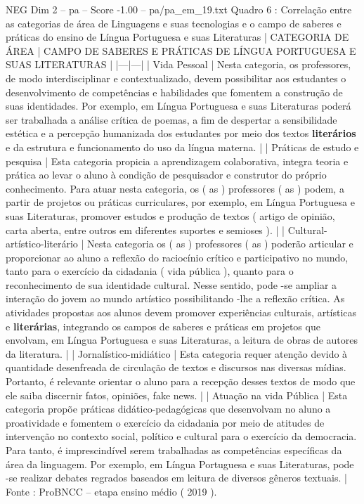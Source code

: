 \begin{textsample}{NEG Dim 2 – pa – Score -1.00 – pa/pa\_em\_19.txt}  \label{ex:f2_neg_221}
Quadro 6 : Correlação entre as categorias de área de Linguagens e suas tecnologias e o campo de saberes e práticas do ensino de Língua Portuguesa e suas Literaturas | CATEGORIA DE ÁREA | CAMPO DE SABERES E PRÁTICAS DE LÍNGUA PORTUGUESA E SUAS LITERATURAS | |---|---| | Vida Pessoal | Nesta categoria, os professores, de modo interdisciplinar e contextualizado, devem possibilitar aos estudantes o desenvolvimento de competências e habilidades que fomentem a construção de suas identidades.
Por exemplo, em Língua Portuguesa e suas Literaturas poderá ser trabalhada a análise crítica de poemas, a fim de despertar a sensibilidade estética e a percepção humanizada dos estudantes por meio dos textos \textbf{literários} e da estrutura e funcionamento do uso da língua materna. | | Práticas de estudo e pesquisa | Esta categoria propicia a aprendizagem colaborativa, integra teoria e prática ao levar o aluno à condição de pesquisador e construtor do próprio conhecimento.
Para atuar nesta categoria, os ( as ) professores ( as ) podem, a partir de projetos ou práticas curriculares, por exemplo, em Língua Portuguesa e suas Literaturas, promover estudos e produção de textos ( artigo de opinião, carta aberta, entre outros em diferentes suportes e semioses ). | | Cultural-artístico-literário | Nesta categoria os ( as ) professores ( as ) poderão articular e proporcionar ao aluno a reflexão do raciocínio crítico e participativo no mundo, tanto para o exercício da cidadania ( vida pública ), quanto para o reconhecimento de sua identidade cultural.
Nesse sentido, pode -se ampliar a interação do jovem ao mundo artístico possibilitando -lhe a reflexão crítica.
As atividades propostas aos alunos devem promover experiências culturais, artísticas e \textbf{literárias}, integrando os campos de saberes e práticas em projetos que envolvam, em Língua Portuguesa e suas Literaturas, a leitura de obras de autores da literatura. | | Jornalístico-midiático | Esta categoria requer atenção devido à quantidade desenfreada de circulação de textos e discursos nas diversas mídias.
Portanto, é relevante orientar o aluno para a recepção desses textos de modo que ele saiba discernir fatos, opiniões, fake news. | | Atuação na vida Pública | Esta categoria propõe práticas didático-pedagógicas que desenvolvam no aluno a proatividade e fomentem o exercício da cidadania por meio de atitudes de intervenção no contexto social, político e cultural para o exercício da democracia.
Para tanto, é imprescindível serem trabalhadas as competências específicas da área da linguagem.
Por exemplo, em Língua Portuguesa e suas Literaturas, pode -se realizar debates regrados baseados em leitura de diversos gêneros textuais. | Fonte : ProBNCC – etapa ensino médio ( 2019 ).

\end{textsample}
